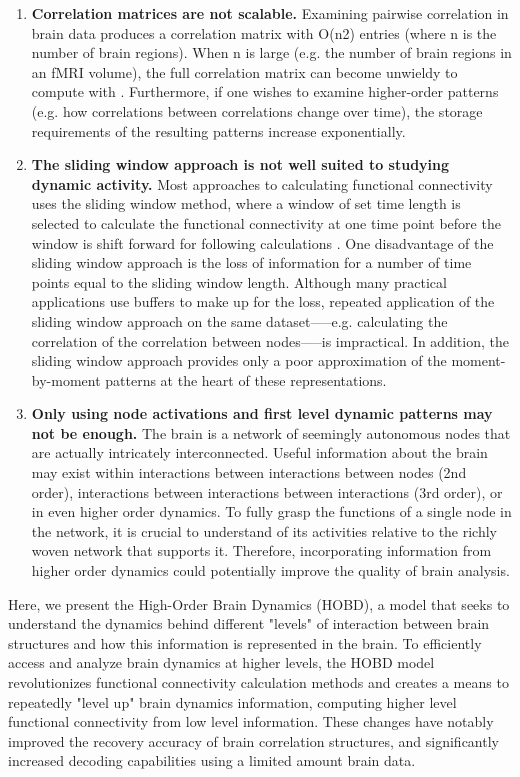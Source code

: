 \documentclass[11pt]{article}
\begin{document}
\begin{enumerate}
\item	\textbf{Correlation matrices are not scalable.} Examining pairwise correlation in brain data
produces a correlation matrix with O(n2) entries (where n is the number of brain regions). When n is large (e.g. the number of brain regions in an fMRI volume), the full correlation matrix can become unwieldy to compute with \cite{Rubinov2010}\cite{Betzel2017}\cite{Craddock2012}\cite{Yeo2011}. Furthermore, if one wishes to examine higher-order patterns (e.g. how correlations between correlations change over time), the storage requirements of the resulting patterns increase exponentially.

\item \textbf{The sliding window approach is not well suited to studying dynamic activity.} Most approaches to calculating functional connectivity uses the sliding window method, where a window of set time length is selected to calculate the functional connectivity at one time point before the window is shift forward for following calculations \cite{enrico2011}\cite{elena2012}. One disadvantage of the sliding window approach is the loss of information for a number of time points equal to the sliding window length. Although many practical applications use buffers to make up for the loss, repeated application of the sliding window approach on the same dataset—--e.g. calculating the correlation of the correlation between nodes—--is impractical. In addition, the sliding window approach provides only a poor approximation of the moment-by-moment patterns at the heart of these representations.

\item \textbf{Only using node activations and first level dynamic patterns may not be enough.} The brain is a network of seemingly autonomous nodes that are actually intricately interconnected. Useful information about the brain may exist within interactions between interactions between nodes (2nd order), interactions between interactions between interactions (3rd order), or in even higher order dynamics. To fully grasp the functions of a single node in the network, it is crucial to understand of its activities relative to the richly woven network that supports it. Therefore, incorporating information from higher order dynamics could potentially improve the quality of brain analysis.

\end{enumerate}

Here, we present the High-Order Brain Dynamics (HOBD), a model that seeks to understand the dynamics behind different "levels" of interaction between brain structures and how this information is represented in the brain. To efficiently access and analyze brain dynamics at higher levels, the HOBD model revolutionizes functional connectivity calculation methods and creates a means to repeatedly "level up" brain dynamics information, computing higher level functional connectivity from low level information. These changes have notably improved the recovery accuracy of brain correlation structures, and significantly increased decoding capabilities using a limited amount brain data.
\end{document}

